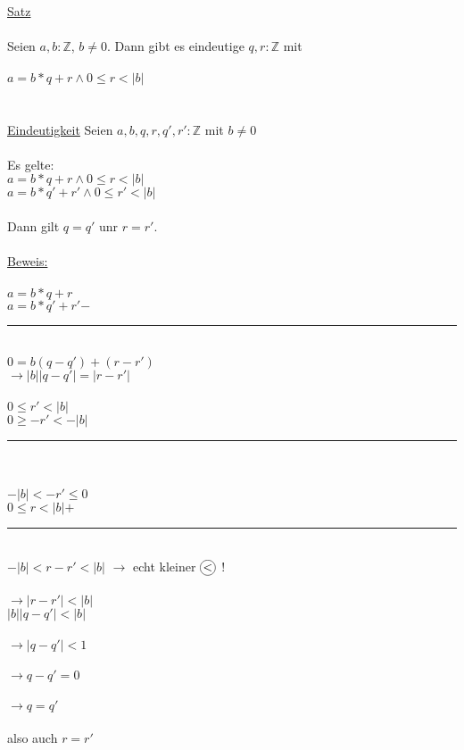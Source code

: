\documentclass[18pt,a4paper]{article}
\newcommand*\circled[1]{\tikz[baseline=(char.base)]{
            \node[shape=circle,draw,inner sep=1pt] (char) {#1};}}
\newcommand{\tab}{\hspace*{2em}}
\begin{document}
\uline{Satz}\\
\\
Seien $a,b: \mathbb{Z}$, $b \neq 0$. Dann gibt es eindeutige $q,r : \mathbb{Z}$ mit\\
\\
$a = b * q + r \wedge 0 \leqslant r < |b|$\\
\\
\\
\uline{Eindeutigkeit} Seien $a,b,q,r,q',r': \mathbb{Z}$ mit $b \neq 0$\\
\\
Es gelte:\\
\tab $a = b * q + r \wedge 0 \leqslant r < |b|$\\
\tab $a = b * q' + r' \wedge 0 \leqslant r' < |b|$\\
\\
Dann gilt $q=q'$ unr $r=r'$.\\
\\
\uline{Beweis:}\\
\\
$a = b * q + r$\\
$a = b * q' + r'$\tab $-$\\
\rule{2cm}{0.2mm}\\
$0=b(q-q') + (r-r')$\\
$\rightarrow |b| |q-q'| = |r-r'|$\\
\\
$0 \leqslant r' < |b|$\\
$0 \geqslant -r' < -|b|$\\
\rule{2cm}{0.2mm}\\
\\
$-|b| < -r' \leqslant 0$\\
$0 \leqslant r < |b|$\tab $+$\\
\rule{2cm}{0.2mm}\\
$-|b| < r-r' < |b|$ \tab $\rightarrow$ echt kleiner $\circled{$<$}$ !\\
\\
$\rightarrow |r-r'| < |b|$\\
$|b| |q-q'| < |b|$\\
\\
$\rightarrow |q-q'| < 1$\\
\\
$\rightarrow q-q' = 0$\\
\\
$\rightarrow q = q'$\\
\\
also auch $r=r'$\\
\end{document}
